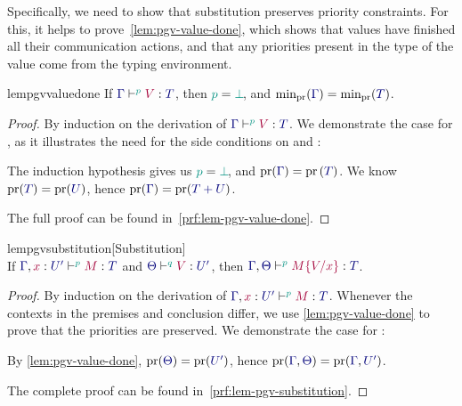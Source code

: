 \documentclass[main.tex]{subfiles}
\begin{document}
Specifically, we need to show that substitution preserves priority constraints. For this, it helps to prove~\cref{lem:pgv-value-done}, which shows that values have finished all their communication actions, and that any priorities present in the type of the value come from the typing environment.
\begin{restatablelemma}{lempgvvaluedone}
  \label{lem:pgv-value-done}
  If $\tseq[\cs{p}]{\ty{\Gamma}}{V}{T}$, then $\cs{p}=\cs{\pbot}$, and $\minpr(\ty{\Gamma})=\minpr(\ty{T})$.
\end{restatablelemma}
\begin{proof}
  By induction on the derivation of $\tseq[\cs{p}]{\ty{\Gamma}}{V}{T}$. We demonstrate the case for , as it illustrates the need for the side conditions on  and :
  \begin{case*}
    The induction hypothesis gives us $\cs{p}=\cs{\pbot}$, and $\pr(\ty{\Gamma})=\pr{(\ty{T})}$. We know $\pr(\ty{T})=\pr({\ty{U}})$, hence $\pr(\ty{\Gamma})=\pr(\ty{\tysum{T}{U}})$.
    \begin{mathpar}
      \small
    \end{mathpar}
  \end{case*}
  The full proof can be found in~\cref{prf:lem-pgv-value-done}.
\end{proof}
\begin{restatablelemma}{lempgvsubstitution}[Substitution]
  \label{lem:pgv-substitution}
  \hfill\\%
  If $\tseq[\cs{p}]{\ty{\Gamma},\tmty{x}{U'}}{M}{T}$ and $\tseq[\cs{q}]{\ty{\Theta}}{V}{U'}$, then $\tseq[\cs{p}]{\ty{\Gamma},\ty{\Theta}}{\subst{M}{V}{x}}{T}$.
\end{restatablelemma}
\begin{proof}
  By induction on the derivation of $\tseq[\cs{p}]{\ty{\Gamma},\tmty{x}{U'}}{M}{T}$. Whenever the contexts in the premises and conclusion differ, we use \cref{lem:pgv-value-done} to prove that the priorities are preserved. We demonstrate the case for :
  \begin{case*}
    By \cref{lem:pgv-value-done}, $\pr(\ty{\Theta})=\pr(\ty{U'})$, hence $\pr(\ty{\Gamma},\ty{\Theta})=\pr(\ty{\Gamma},\ty{U'})$.
    \begin{mathpar}
      \small
    \end{mathpar}
  \end{case*}
  The complete proof can be found in~\cref{prf:lem-pgv-substitution}.
\end{proof}
\end{document}
